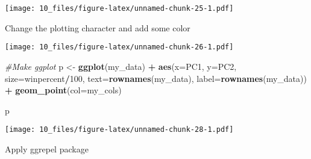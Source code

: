 \documentclass[
]{article}
\newenvironment{Shaded}{\begin{snugshade}}{\end{snugshade}}
\newcommand{\AttributeTok}[1]{\textcolor[rgb]{0.13,0.29,0.53}{#1}}
\newcommand{\CommentTok}[1]{\textcolor[rgb]{0.56,0.35,0.01}{\textit{#1}}}
\newcommand{\DecValTok}[1]{\textcolor[rgb]{0.00,0.00,0.81}{#1}}
\newcommand{\FunctionTok}[1]{\textcolor[rgb]{0.13,0.29,0.53}{\textbf{#1}}}
\newcommand{\NormalTok}[1]{#1}
\newcommand{\OtherTok}[1]{\textcolor[rgb]{0.56,0.35,0.01}{#1}}
\newcommand{\SpecialCharTok}[1]{\textcolor[rgb]{0.81,0.36,0.00}{\textbf{#1}}}
\begin{document}
\texttt{[image: 10\_files/figure-latex/unnamed-chunk-25-1.pdf]}

Change the plotting character and add some color

\begin{Shaded}
\end{Shaded}

\texttt{[image: 10\_files/figure-latex/unnamed-chunk-26-1.pdf]}

\begin{Shaded}
\end{Shaded}

\begin{Shaded}
\begin{Highlighting}[]
\CommentTok{\#Make ggplot}
\NormalTok{p }\OtherTok{\textless{}{-}} \FunctionTok{ggplot}\NormalTok{(my\_data) }\SpecialCharTok{+} 
        \FunctionTok{aes}\NormalTok{(}\AttributeTok{x=}\NormalTok{PC1, }\AttributeTok{y=}\NormalTok{PC2, }
            \AttributeTok{size=}\NormalTok{winpercent}\SpecialCharTok{/}\DecValTok{100}\NormalTok{,  }
            \AttributeTok{text=}\FunctionTok{rownames}\NormalTok{(my\_data),}
            \AttributeTok{label=}\FunctionTok{rownames}\NormalTok{(my\_data)) }\SpecialCharTok{+}
        \FunctionTok{geom\_point}\NormalTok{(}\AttributeTok{col=}\NormalTok{my\_cols)}

\NormalTok{p}
\end{Highlighting}
\end{Shaded}

\texttt{[image: 10\_files/figure-latex/unnamed-chunk-28-1.pdf]}

Apply ggrepel package
\end{document}
